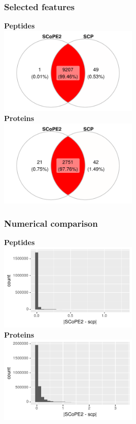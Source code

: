 \documentclass{beamer}
\newcommand{\frametitlesection}[1]{\frametitle{\centering #1 \footnotesize \hspace{0pt plus 1 filll} \insertsection}}
\begin{document}
\begin{frame}
    \frametitlesection{Selected features}

    \centering
    \textbf{Peptides} \\
    \includegraphics[width=0.5\textwidth]{figs/Benchmark_pep_venn.pdf} \\
    \textbf{Proteins}\\
    \includegraphics[width=0.5\textwidth]{figs/Benchmark_prot_venn.pdf}

\end{frame}

\begin{frame}
    \frametitlesection{Numerical comparison}

    \centering
    \textbf{Peptides} \\
    \includegraphics[width=0.5\textwidth]{figs/Benchmark_pep_err.pdf} \\
    \textbf{Proteins}\\
    \includegraphics[width=0.5\textwidth]{figs/Benchmark_prot_err.pdf}

\end{frame}
\end{document}
